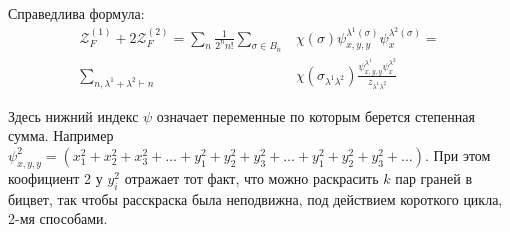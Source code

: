 \begin{statement}
Справедлива формула:
\begin{equation}
\label{eq:h-fr1}
\begin{split}
\mathcal Z_F^{(1)} + 2\mathcal Z_F^{(2)} = 
\sum_{n}\frac{1}{2^{n}n!}\sum_{\sigma \in B_n}&\chi(\sigma)
\psi_{x, y, y}^{\lambda^1(\sigma)} \psi_{x}^{\lambda^2(\sigma)} = \\
\sum_{n, \lambda^1 + \lambda^2 \vdash n}&\chi(\sigma_{\lambda^1 \lambda^2})
\frac{\psi_{x, y, y}^{\lambda^1} \psi_{x}^{\lambda^2}}{z_{\lambda^1 \lambda^2}}
\end{split}
\end{equation}
\end{statement}
Здесь нижний индекс $\psi$ означает переменные по которым берется степенная
сумма. Например $\psi_{x, y, y}^2 =  (x_1^2 + x_2^2 + x_3^2 + \dots + y_1^2 +
y_2^2 + y_3^2 + \dots + y_1^2 + y_2^2 + y_3^2 + \dots)$. При этом коофициент
2 у $y_i^2$ отражает тот факт, что можно раскрасить $k$ пар граней в бицвет,
так чтобы расскраска была неподвижна, под действием короткого цикла, 2-мя способами.

